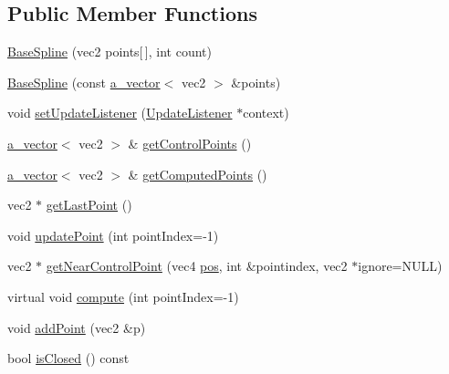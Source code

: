 \subsection*{Public Member Functions}
\begin{DoxyCompactItemize}
\item 
\hyperlink{class_agmd_1_1_base_spline_a6e40aa94bfd69700a66b8e246794902d}{Base\+Spline} (vec2 points\mbox{[}$\,$\mbox{]}, int count)
\item 
\hyperlink{class_agmd_1_1_base_spline_a07b1cd520ff46d79800f59965cc58939}{Base\+Spline} (const \hyperlink{_vector_8h_a3df82cea60ff4ad0acb44e58454406a5}{a\+\_\+vector}$<$ vec2 $>$ \&points)
\item 
void \hyperlink{class_agmd_1_1_base_spline_a57aadd96598bfe89500fd260dfc5d5f2}{set\+Update\+Listener} (\hyperlink{class_agmd_1_1_base_spline_1_1_update_listener}{Update\+Listener} $\ast$context)
\item 
\hyperlink{_vector_8h_a3df82cea60ff4ad0acb44e58454406a5}{a\+\_\+vector}$<$ vec2 $>$ \& \hyperlink{class_agmd_1_1_base_spline_a84c4c8a1aad1fa24fd97623e55eebfa9}{get\+Control\+Points} ()
\item 
\hyperlink{_vector_8h_a3df82cea60ff4ad0acb44e58454406a5}{a\+\_\+vector}$<$ vec2 $>$ \& \hyperlink{class_agmd_1_1_base_spline_a2c138446fa3460c763ce07e61e3c4541}{get\+Computed\+Points} ()
\item 
vec2 $\ast$ \hyperlink{class_agmd_1_1_base_spline_a7e897b0d2b89b6fcf1bc954073b16c03}{get\+Last\+Point} ()
\item 
void \hyperlink{class_agmd_1_1_base_spline_a3be55677be67bf6c6dd20678c7f77416}{update\+Point} (int point\+Index=-\/1)
\item 
vec2 $\ast$ \hyperlink{class_agmd_1_1_base_spline_a70d5341006a77b201192143e93181dcc}{get\+Near\+Control\+Point} (vec4 \hyperlink{_examples_2_planet_2_app_8cpp_aa8a1c0491559faca4ebd0881575ae7f0}{pos}, int \&pointindex, vec2 $\ast$ignore=N\+U\+L\+L)
\item 
virtual void \hyperlink{class_agmd_1_1_base_spline_a589f90c641d154374b477152de1ac7a7}{compute} (int point\+Index=-\/1)
\item 
void \hyperlink{class_agmd_1_1_base_spline_a291c1c90c2c790a39d153a606138a50e}{add\+Point} (vec2 \&p)
\item 
bool \hyperlink{class_agmd_1_1_base_spline_aa47f9e6bfeb67d36c7ec87927d8297f3}{is\+Closed} () const 
\end{DoxyCompactItemize}
